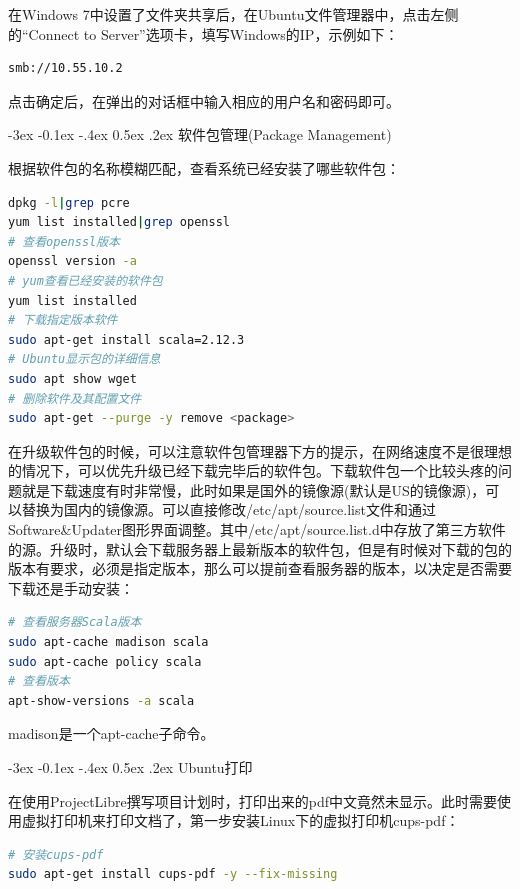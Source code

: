 \documentclass[12pt]{book}
\makeatletter
\numberwithin{dummy}{section}
\theoremstyle{ocrenumbox}
\theoremstyle{blacknumex}
\theoremstyle{blacknumbox}
\theoremstyle{ocrenum}
\renewcommand{\subsection}{\@startsection {subsection}{2}{\z@}
	{-3ex \@plus -0.1ex \@minus -.4ex}
	{0.5ex \@plus.2ex }
	{\normalfont\sffamily\bfseries}}
\makeatother
\begin{document}
在Windows 7中设置了文件夹共享后，在Ubuntu文件管理器中，点击左侧的“Connect to Server”选项卡，填写Windows的IP，示例如下：

\begin{lstlisting}[language=HTML]
smb://10.55.10.2
\end{lstlisting}

点击确定后，在弹出的对话框中输入相应的用户名和密码即可。

\subsection{软件包管理(Package Management)}

根据软件包的名称模糊匹配，查看系统已经安装了哪些软件包：

\begin{lstlisting}[language=Bash]
dpkg -l|grep pcre
yum list installed|grep openssl
# 查看openssl版本
openssl version -a
# yum查看已经安装的软件包
yum list installed
# 下载指定版本软件
sudo apt-get install scala=2.12.3
# Ubuntu显示包的详细信息
sudo apt show wget
# 删除软件及其配置文件
sudo apt-get --purge -y remove <package>
\end{lstlisting}

在升级软件包的时候，可以注意软件包管理器下方的提示，在网络速度不是很理想的情况下，可以优先升级已经下载完毕后的软件包。下载软件包一个比较头疼的问题就是下载速度有时非常慢，此时如果是国外的镜像源(默认是US的镜像源)，可以替换为国内的镜像源。可以直接修改/etc/apt/source.list文件和通过Software\&Updater图形界面调整。其中/etc/apt/source.list.d中存放了第三方软件的源。升级时，默认会下载服务器上最新版本的软件包，但是有时候对下载的包的版本有要求，必须是指定版本，那么可以提前查看服务器的版本，以决定是否需要下载还是手动安装：

\begin{lstlisting}[language=Bash]
# 查看服务器Scala版本
sudo apt-cache madison scala
sudo apt-cache policy scala
# 查看版本
apt-show-versions -a scala
\end{lstlisting}

madison是一个apt-cache子命令。

\subsection{Ubuntu打印}

在使用ProjectLibre撰写项目计划时，打印出来的pdf中文竟然未显示。此时需要使用虚拟打印机来打印文档了，第一步安装Linux下的虚拟打印机cups-pdf：

\begin{lstlisting}[language=Bash]
# 安装cups-pdf
sudo apt-get install cups-pdf -y --fix-missing
\end{lstlisting}
\end{document}
